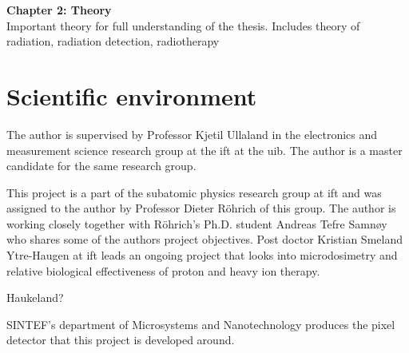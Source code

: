 \documentclass[../main/thesis.tex]{subfiles}
\begin{document}
\textbf{Chapter 2: Theory}\\
Important theory for full understanding of the thesis. Includes theory of radiation, radiation detection, radiotherapy




\section{Scientific environment}
\label{i-environment}
The author is supervised by Professor Kjetil Ullaland in the electronics and measurement science research group at the \gls{ift} at the \gls{uib}. The author is a master candidate for the same research group.

This project is a part of the subatomic physics research group at \gls{ift} and was assigned to the author by Professor Dieter Röhrich of this group. The author is working closely together with Röhrich's Ph.D. student Andreas Tefre Samnøy who shares some of the authors project objectives. Post doctor Kristian Smeland Ytre-Haugen at \gls{ift} leads an ongoing project that looks into microdosimetry and relative biological effectiveness of proton and heavy ion therapy. 

Haukeland?

SINTEF's department of Microsystems and Nanotechnology produces the pixel detector that this project is developed around. 
\end{document}
